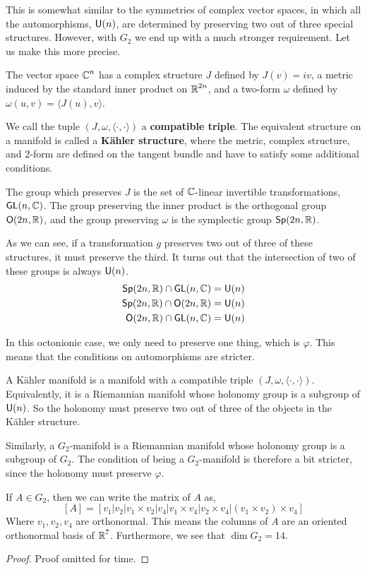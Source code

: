 \begin{remark*}
    This is somewhat similar to the symmetries of complex vector spaces, in which all the automorphisms, $\operatorname{\textsf{U}}(n)$, are determined by preserving two out of three special structures. However, with $G_2$ we end up with a much stronger requirement. Let us make this more precise.
    
    The vector space $\operatorname{\mathbb{C}}^n$ has a complex structure $J$ defined by $J(v) = iv$, a metric induced by the standard inner product on $\operatorname{\mathbb{R}}^{2n}$, and a two-form $\omega$ defined by $\omega(u,v) = \langle J(u),v\rangle$.

    We call the tuple $(J,\omega,\langle\cdot,\cdot\rangle)$ a \textbf{compatible triple}. The equivalent structure on a manifold is called a \textbf{K\"ahler structure}, where the metric, complex structure, and 2-form are defined on the tangent bundle and have to satisfy some additional conditions.

    The group which preserves $J$ is the set of $\operatorname{\mathbb{C}}$-linear invertible transformations, $\operatorname{\textsf{GL}}(n,\operatorname{\mathbb{C}})$. The group preserving the inner product is the orthogonal group $\operatorname{\textsf{O}}(2n,\operatorname{\mathbb{R}})$, and the group preserving $\omega$ is the symplectic group $\operatorname{\textsf{Sp}}(2n,\operatorname{\mathbb{R}})$.

    As we can see, if a transformation $g$ preserves two out of three of these structures, it must preserve the third. It turns out that the intersection of two of these groups is always $\operatorname{\textsf{U}}(n)$.
    \begin{align*}\operatorname{\textsf{Sp}}(2n,\operatorname{\mathbb{R}})\cap \operatorname{\textsf{GL}}(n,\operatorname{\mathbb{C}}) &= \operatorname{\textsf{U}}(n)\\\operatorname{\textsf{Sp}}(2n,\operatorname{\mathbb{R}})\cap \operatorname{\textsf{O}}(2n,\operatorname{\mathbb{R}}) &= \operatorname{\textsf{U}}(n)\\\operatorname{\textsf{O}}(2n,\operatorname{\mathbb{R}})\cap \operatorname{\textsf{GL}}(n,\operatorname{\mathbb{C}}) &= \operatorname{\textsf{U}}(n)\end{align*}

    In this octonionic case, we only need to preserve one thing, which is $\varphi$. This means that the conditions on automorphisms are stricter.
\end{remark*}
\begin{remark*}
    A K\"ahler manifold is a manifold with a compatible triple $(J,\omega,\langle\cdot,\cdot\rangle)$. Equivalently, it is a Riemannian manifold whose holonomy group is a subgroup of $\operatorname{\textsf{U}}(n)$. So the holonomy must preserve two out of three of the objects in the K\"ahler structure.

    Similarly, a $G_2$-manifold is a Riemannian manifold whose holonomy group is a subgroup of $G_2$. The condition of being a $G_2$-manifold is therefore a bit stricter, since the holonomy must preserve $\varphi$. 
\end{remark*}
\begin{lemma}
    If $A \in G_2$, then we can write the matrix of $A$ as,
    \[[A] = [v_1 | v_2 | v_1\times v_2 | v_4 | v_1\times v_4 | v_2\times v_4| (v_1\times v_2)\times v_4]\]
    Where $v_1,v_2,v_4$ are orthonormal. This means the columns of $A$ are an oriented orthonormal basis of $\operatorname{\mathbb{R}}^7$. Furthermore, we see that $\dim G_2 = 14$.
\end{lemma}
\begin{proof}
    Proof omitted for time.
\end{proof}


